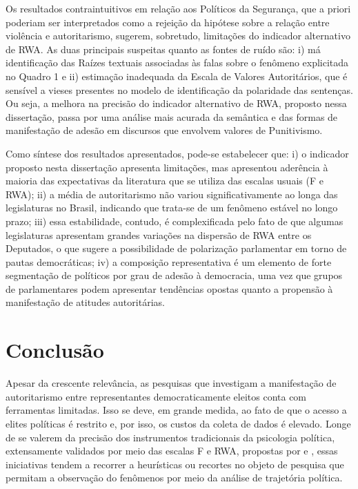 \documentclass[
12pt,				%
openright,			%
twoside,			%
a4paper,			%
english,			%
french,				%
spanish,			%
brazil				%
]{abntex2}
\begin{document}
Os resultados contraintuitivos em relação aos Políticos da Segurança, que a priori poderiam ser interpretados como a rejeição da hipótese sobre a relação entre violência e autoritarismo, sugerem, sobretudo, limitações do indicador alternativo de RWA. As duas principais suspeitas quanto as fontes de ruído são: i) má identificação das Raízes textuais associadas às falas sobre o fenômeno explicitada no Quadro 1 e ii) estimação inadequada da Escala de Valores Autoritários, que é sensível a vieses presentes no modelo de identificação da polaridade das sentenças. Ou seja, a melhora na precisão do indicador alternativo de RWA, proposto nessa dissertação, passa por uma análise mais acurada da semântica e das formas de manifestação de adesão em discursos que envolvem valores de Punitivismo. 

Como síntese dos resultados apresentados, pode-se estabelecer que: i) o indicador proposto nesta dissertação apresenta limitações, mas apresentou aderência à maioria das expectativas da literatura que se utiliza das escalas usuais (F e RWA); ii) a média de autoritarismo não variou significativamente ao longa das legislaturas no Brasil, indicando que trata-se de um fenômeno estável no longo prazo; iii) essa estabilidade, contudo, é complexificada pelo fato de que algumas legislaturas apresentam grandes variações na dispersão de RWA entre os Deputados, o que sugere a possibilidade de polarização parlamentar em torno de pautas democráticas; iv) a composição representativa é um elemento de forte segmentação de políticos por grau de adesão à democracia, uma vez que grupos de parlamentares podem apresentar tendências opostas quanto a propensão à manifestação de atitudes autoritárias. 

\chapter{Conclusão}

Apesar da crescente relevância, as pesquisas que investigam a manifestação de autoritarismo entre representantes democraticamente eleitos conta com ferramentas limitadas. Isso se deve, em grande medida, ao fato de que o acesso a elites políticas é restrito e, por isso, os custos da coleta de dados é elevado. Longe de se valerem da precisão dos instrumentos tradicionais da psicologia política, extensamente validados por meio das escalas F e RWA, propostas por  e , essas iniciativas tendem a recorrer a heurísticas ou recortes no objeto de pesquisa que permitam a observação do fenômenos por meio da análise de trajetória política.  
\end{document}
